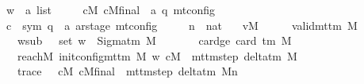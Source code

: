 \begin{isabellebody}
\ \ \ \ \ w\ {\isacharcolon}{\kern0pt}{\isacharcolon}{\kern0pt}\ {\isachardoublequoteopen}{\isacharprime}{\kern0pt}a\ list{\isachardoublequoteclose}\isanewline
\ \ \ \ \ cM\ cM{\isacharunderscore}{\kern0pt}final\ {\isacharcolon}{\kern0pt}{\isacharcolon}{\kern0pt}\ {\isachardoublequoteopen}{\isacharparenleft}{\kern0pt}{\isacharprime}{\kern0pt}a{\isacharcomma}{\kern0pt}\ {\isacharprime}{\kern0pt}q{\isacharparenright}{\kern0pt}\ mt{\isacharunderscore}{\kern0pt}config{\isachardoublequoteclose}\isanewline
\ \ \ \ \ c{\isacharprime}{\kern0pt}\ {\isacharcolon}{\kern0pt}{\isacharcolon}{\kern0pt}\ {\isachardoublequoteopen}{\isacharparenleft}{\kern0pt}sym{}{\isacharcomma}{\kern0pt}\ {\isacharprime}{\kern0pt}q\ {\isasymtimes}\ {\isacharprime}{\kern0pt}a\ ar{\isacharunderscore}{\kern0pt}stage{\isacharparenright}{\kern0pt}\ mt{\isacharunderscore}{\kern0pt}config{\isachardoublequoteclose}\isanewline
\ \ \ \ \ n\ {\isacharcolon}{\kern0pt}{\isacharcolon}{\kern0pt}\ nat\isanewline
\ \ \ vM{\isacharcolon}{\kern0pt}\ \ \ \ \ \ {\isachardoublequoteopen}valid{\isacharunderscore}{\kern0pt}mttm\ M{\isachardoublequoteclose}\isanewline
\ \ \ \ \ \ \ w{\isacharunderscore}{\kern0pt}sub{\isacharcolon}{\kern0pt}\ \ \ {\isachardoublequoteopen}set\ w\ {\isasymsubseteq}\ Sigma{\isacharunderscore}{\kern0pt}tm\ M{\isachardoublequoteclose}\isanewline
\ \ \ \ \ \ \ card{\isacharunderscore}{\kern0pt}ge{\isacharcolon}{\kern0pt}\ {\isachardoublequoteopen}card\ {\isacharparenleft}{\kern0pt}{\isasymGamma}{\isacharunderscore}{\kern0pt}tm\ M{\isacharparenright}{\kern0pt}\ {\isasymge}\ {}{\isachardoublequoteclose}\isanewline
\ \ \ \ \ \ \ reach{\isacharunderscore}{\kern0pt}M{\isacharcolon}{\kern0pt}\ {\isachardoublequoteopen}{\isacharparenleft}{\kern0pt}init{\isacharunderscore}{\kern0pt}config{\isacharunderscore}{\kern0pt}mttm\ M\ w{\isacharcomma}{\kern0pt}\ cM{\isacharparenright}{\kern0pt}\ {\isasymin}\ {\isacharparenleft}{\kern0pt}mttm{\isacharunderscore}{\kern0pt}step\ {\isacharparenleft}{\kern0pt}delta{\isacharunderscore}{\kern0pt}tm\ M{\isacharparenright}{\kern0pt}{\isacharparenright}{\kern0pt}\isactrlsup {\isacharasterisk}{\kern0pt}{\isachardoublequoteclose}\isanewline
\ \ \ \ \ \ \ trace{\isacharcolon}{\kern0pt}\ \ \ {\isachardoublequoteopen}{\isacharparenleft}{\kern0pt}cM{\isacharcomma}{\kern0pt}\ cM{\isacharunderscore}{\kern0pt}final{\isacharparenright}{\kern0pt}\ {\isasymin}\ {\isacharparenleft}{\kern0pt}mttm{\isacharunderscore}{\kern0pt}step\ {\isacharparenleft}{\kern0pt}delta{\isacharunderscore}{\kern0pt}tm\ M{\isacharparenright}{\kern0pt}{\isacharparenright}{\kern0pt}{\isacharcircum}{\kern0pt}{\isacharcircum}{\kern0pt}n{\isachardoublequoteclose}\isanewline

\end{isabellebody}
